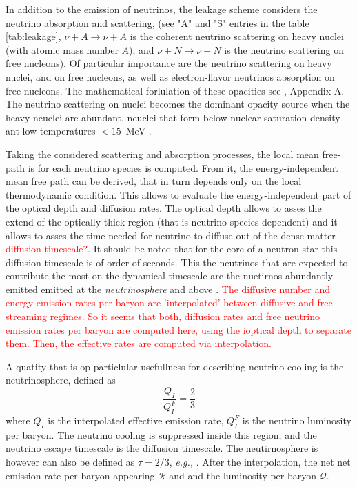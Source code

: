 \documentclass[11pt,a4paper,headinclude=true,DIV=14,BCOR=8mm,chapterprefix,listof=totoc,twoside,openright,abstracton]{scrbook}
\newcommand{\red}[1]{\textcolor{red}{#1}}
\begin{document}
In addition to the emission of neutrinos, the leakage scheme considers the neutrino absorption and scattering, (see "A" and "S" entries in the table \ref{tab:leakage}, $\nu+A\rightarrow\nu+A$ is the coherent neutrino scattering on heavy nuclei (with atomic mass number $A$), and $\nu+N\rightarrow\nu+N$ is the neutrino scattering on free nucleons).
Of particular importance are the neutrino scattering on heavy nuclei, and on free nucleons, as well as electron-flavor neutrinos absorption on free nucleons. The mathematical forlulation of these opacities see \cite{Galeazzi:2013mia}, Appendix A.
The neutrino scattering on nuclei becomes the dominant opacity source when the heavy neuclei are abundant, neuclei that form below nuclear saturation density ant low temperatures $<15$~MeV \cite{Rosswog:2003rv}.

Taking the considered scattering and absorption processes, the local mean free-path is for each neutrino species is computed. From it, the energy-independent mean free path can be derived, that in turn depends only on the local thermodynamic condition. This allows to evaluate the energy-independent part of the optical depth and diffusion rates.
The optical depth allows to asses the extend of the optically thick region (that is neutrino-species dependent) and it allows to asses the time needed for neutrino to diffuse out of the dense matter \red{diffusion timescale?}. 
It should be noted that for the core of a neutron star this diffusion timescale is of order of seconds. This the neutrinos that are expected to contribute the most on the dynamical timescale are the nuetirnos abundantly emitted emitted at the \textit{neutrinosphere} and above \cite{Galeazzi:2013mia,Endrizzi:2018uwl}.
\red{The diffusive number and energy emission rates per baryon are 'interpolated' between diffusive and free-streaming regimes.
So it seems that both, diffusion rates and free neutrino emission rates per baryon are computed here, using the ioptical depth to separate them. Then, the effective rates are computed via interpolation.}

A quatity that is op particlular usefullness for describing neutrino cooling  is the neutrinosphere,
defined as \cite{Galeazzi:2013mia}
\begin{equation}
    \frac{Q_I}{Q_{I}^F} = \frac{2}{3}
\end{equation}
where $Q_I$ is the interpolated effective emission rate, $Q_I^F$ is the neutrino luminosity per baryon.
The neutrino cooling is suppressed inside this region, and the neutrino escape timescale is the diffusion timescale. 
The neutirnosphere is however can also be defined as $\tau=2/3$, \textit{e.g.,} \cite{Rosswog:2003rv,Endrizzi:2018uwl}.
After the interpolation, the net net emission rate per baryon appearing $\mathcal{R}$ and and the luminosity per baryon $\mathcal{Q}$.
\end{document}
